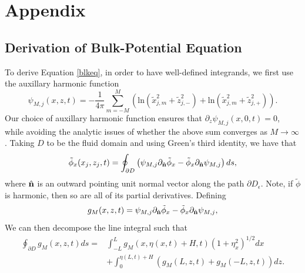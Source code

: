 \documentclass[a4paper,11pt]{article}
\newcommand{\p}{\partial}
\begin{document}
\section{Appendix}
\subsection{Derivation of Bulk-Potential Equation \label{deriv}}
To derive Equation \eqref{blkeq}, in order to have well-defined integrands, we first use the auxillary harmonic function
\[
\psi_{M,j}(x,z,t) = - \frac{1}{4\pi}\sum_{m=-M}^{M} \left( \mbox{ln}\left( \tilde{x}_{j,m}^{2} + \tilde{z}_{j,-}^{2}  \right) + \mbox{ln}\left( \tilde{x}_{j,m}^{2} + \tilde{z}_{j,+}^{2} \right)\right).
\]
Our choice of auxillary harmonic function ensures that $\p_{z}\psi_{M,j}(x,0,t)=0$, while avoiding the analytic issues of whether the above sum converges as $M\rightarrow \infty$.  Taking $D$ to be the fluid domain and using Green's third identity, we have that 
\[
\tilde{\phi}_{x}(x_{j},z_{j},t) =  \oint_{\p D} \left(\psi_{M,j}\p_{\hat{{\bf n}}}\tilde{\phi}_{x}-\tilde{\phi}_{x}\p_{\hat{{\bf n}}}\psi_{M,j} \right) ds,
\]
where $\hat{{\bf n}}$ is an outward pointing unit normal vector along the path $\p D_{\epsilon}$.  Note, if $\tilde{\phi}$ is harmonic, then so are all of its partial derivatives.  Defining
\[
g_{M}(x,z,t) = \psi_{M,j}\p_{\hat{{\bf n}}}\tilde{\phi}_{x}-\tilde{\phi}_{x}\p_{\hat{{\bf n}}}\psi_{M,j},
\]
We can then decompose the line integral such that 
\begin{align*}
\oint_{\p D} g_{M}(x,z,t) ds = & \int_{-L}^{L}g_{M}(x,\eta(x,t)+H,t) (1+\eta_{x}^{2})^{1/2}dx \\
& + \int_{0}^{\eta(L,t)+H} \left(g_{M}(L,z,t) + g_{M}(-L,z,t)\right) dz.  
\end{align*}
\end{document}
